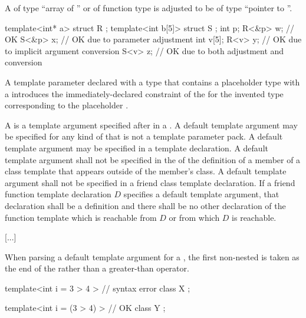 \documentclass{wg21}
\begin{document}
\pnum
A 
%
of type ``array of '' or
%
of function type 
is adjusted to be of type ``pointer to ''.
\begin{example}
    \begin{codeblock}
        template<int* a>   struct R {  };
        template<int b[5]> struct S {  };
        int p;
        R<&p> w;                        // OK
        S<&p> x;                        // OK due to parameter adjustment
        int v[5];
        R<v> y;                         // OK due to implicit argument conversion
        S<v> z;                         // OK due to both adjustment and conversion
    \end{codeblock}
\end{example}

\pnum
A  template parameter declared with a type that
contains a placeholder type with a 
introduces the immediately-declared constraint
of the 
for the invented type corresponding to the placeholder .

\pnum
A  is
a template argument  specified after \tcode{=}
in a .
A default template argument may be specified for
any kind of  
that is not a template parameter pack.
A default template argument may be specified in a template declaration.
A default template argument shall not be specified in
the 
of the definition of a member of a class template
that appears outside of the member's class.
A default template argument
shall not be specified in a friend class template declaration.
If a friend function template declaration $D$
specifies a default template argument,
that declaration shall be a definition and
there shall be no other declaration of the function template
which is reachable from $D$ or from which $D$ is reachable.

\textcolor{noteclr}{[...]}

%
\pnum
When parsing a default template argument
for a  ,
the first non-nested \tcode{>} is taken as
the end of the 
rather than a greater-than operator.
\begin{example}
    \begin{codeblock}
        template<int i = 3 > 4 >        // syntax error
        class X {  };

        template<int i = (3 > 4) >      // OK
        class Y {  };
    \end{codeblock}
\end{example}
\end{document}

